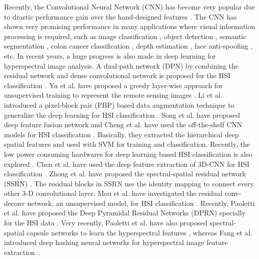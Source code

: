 \documentclass[journal]{IEEEtran}
\begin{document}
Recently, the Convolutional Neural Network (CNN) has become very popular due to drastic performance gain over the hand-designed features \cite{krizhevsky2012imagenet}. The CNN has shown very promising performance in many applications where visual information processing is required, such as image classification \cite{he2016deep,roy2019lisht}, object detection \cite{ren2015faster}, semantic segmentation \cite{he2017mask}, colon cancer classification \cite{basha2018rccnet}, depth estimation \cite{repala2018dual}, face anti-spoofing \cite{nagpal2018performance}, etc.
In recent years, a huge progress is also made in deep learning for hyperspectral image analysis. A dual-path network (DPN) by combining the residual network and dense convolutional network is proposed for the HSI classification \cite{kang2018dual}. Yu et al. have proposed a greedy layer-wise approach for unsupervised training to represent the remote sensing images \cite{yu2018unsupervised}. Li et al. introduced a pixel-block pair (PBP) based data augmentation technique to generalize the deep learning for HSI classification \cite{li2018data}. Song et al. have proposed deep feature fusion network \cite{song2018deep} and Cheng et al. have used the off-the-shelf CNN models for HSI classification \cite{cheng2018exploring}. Basically, they extracted the hierarchical deep spatial features and used with SVM for training and classification. Recently, the low power consuming hardwares for deep learning based HSI classification is also explored \cite{haut2018low}. Chen et al. have used the deep feature extraction of 3D-CNN for HSI classification \cite{chen2016deep}. Zhong et al. have proposed the spectral-spatial residual network (SSRN) \cite{zhong2018spectral}. The residual blocks in SSRN use the identity mapping to connect every other 3-D convolutional layer. Mou et al. have investigated the residual conv-deconv network, an unsupervised model, for HSI classification \cite{mou2018unsupervised}. Recently, Paoletti et al. have proposed the Deep Pyramidal Residual Networks (DPRN) specially for the HSI data \cite{paoletti2018deep}. Very recently, Paoletti et al. have also proposed  spectral-spatial capsule networks to learn the hyperspectral features \cite{paoletti2018capsule}, whereas Fang et al. introduced deep hashing neural networks for hyperspectral image feature extraction~\cite{fang2019hashing}.
\end{document}
